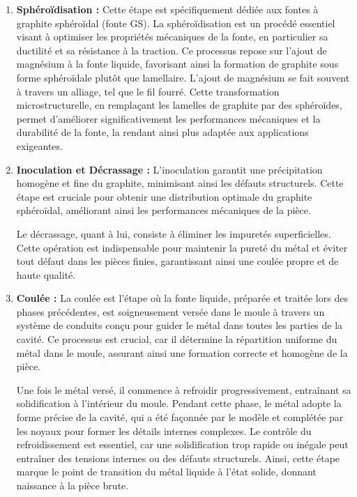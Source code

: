 \documentclass[12pt]{article}
\begin{document}
\begin{enumerate}




    \item \textbf{Sphéroïdisation :} 
    Cette étape est spécifiquement dédiée aux fontes à graphite sphéroïdal 
    (fonte GS). La sphéroïdisation est un procédé essentiel visant à 
    optimiser les propriétés mécaniques de la fonte, en particulier sa 
    ductilité et sa résistance à la traction. Ce processus repose sur 
    l’ajout de magnésium à la fonte liquide, favorisant ainsi la formation 
    de graphite sous forme sphéroïdale plutôt que lamellaire. L'ajout de 
    magnésium se fait souvent à travers un alliage, tel que le fil fourré. 
    Cette transformation microstructurelle, en remplaçant les lamelles de 
    graphite par des sphéroïdes, permet d'améliorer significativement les 
    performances mécaniques et la durabilité de la fonte, la rendant ainsi 
    plus adaptée aux applications exigeantes.



    \item \textbf{Inoculation et Décrassage :} L'inoculation garantit une 
    précipitation homogène et fine du graphite, minimisant ainsi les 
    défauts structurels. Cette étape est cruciale pour obtenir une 
    distribution optimale du graphite sphéroïdal, améliorant ainsi les 
    performances mécaniques de la pièce.

    Le décrassage, quant à lui, consiste à éliminer les impuretés 
    superficielles. Cette opération est indispensable pour maintenir la 
    pureté du métal et éviter tout défaut dans les pièces finies, 
    garantissant ainsi une coulée propre et de haute qualité.

    
    \item \textbf{ Coulée :} La coulée est l'étape où la fonte liquide, 
    préparée et traitée lors des phases précédentes, est soigneusement 
    versée dans le moule à travers un système de conduits conçu pour 
    guider le métal dans toutes les parties de la cavité. Ce processus est
    crucial, car il détermine la répartition uniforme du métal dans le 
    moule, assurant ainsi une formation correcte et homogène de la pièce.

    Une fois le métal versé, il commence à refroidir progressivement, 
    entraînant sa solidification à l'intérieur du moule. Pendant cette 
    phase, le métal adopte la forme précise de la cavité, qui a été 
    façonnée par le modèle et complétée par les noyaux pour former les 
    détails internes complexes. Le contrôle du refroidissement est 
    essentiel, car une solidification trop rapide ou inégale peut 
    entraîner des tensions internes ou des défauts structurels. 
    Ainsi, cette étape marque le point de transition du métal liquide à 
    l'état solide, donnant naissance à la pièce brute.
    

\end{enumerate}
\end{document}
